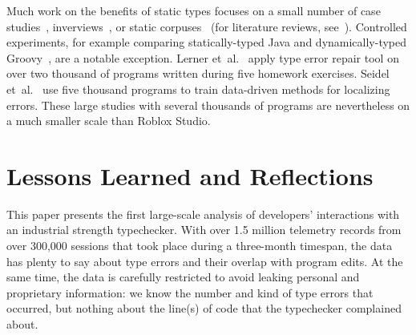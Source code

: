 \documentclass[english,submission,cleveref]{programming}
\begin{document}
Much work on the benefits of static types focuses on a small number
of case studies~\cite{w-popl-1986,hw-scp-2004,td-tosem-2001},
inverviews~\cite{cdhhjklwya-hatra-2020,gstf-hatra-2021,cams-oopsla-2020},
or static corpuses~\cite{rppd-fse-2014,bhmvv-toplas-2019,bmvv-arxiv-2019}
(for literature reviews, see~\cite{empirical-types,heeren-thesis}).
Controlled experiments, for example comparing statically-typed Java and dynamically-typed
Groovy~\cite{khrts-icpc-2012}, are a notable exception.
Lerner et~al.~\cite{lfgc-pldi-2007} apply type error repair tool on over two thousand
of programs written during five homework exercises.
Seidel et~al.~\cite{sscwj-oopsla-2017,sjw-jfp-2018} use five thousand programs
to train data-driven methods for localizing errors.
These large studies with several thousands of programs are
nevertheless on a much smaller scale than Roblox Studio.

%
%
%
%
%





\section{Lessons Learned and Reflections}
\label{s:conclusion}

This paper presents the first large-scale analysis of developers' interactions with
an industrial strength typechecker.
With over 1.5 million telemetry records from over 300,000 sessions
that took place during a three-month timespan, the data has plenty to say about
type errors and their overlap with program edits.
At the same time, the data is carefully restricted to avoid leaking personal
and proprietary information: we know the number and kind of type errors
that occurred, but nothing about the line(s) of code that the typechecker
complained about.
\end{document}
